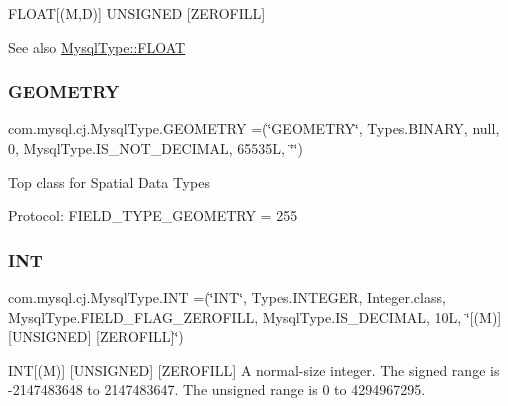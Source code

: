 F\+L\+O\+AT\mbox{[}(M,D)\mbox{]} U\+N\+S\+I\+G\+N\+ED \mbox{[}Z\+E\+R\+O\+F\+I\+LL\mbox{]}

\begin{DoxySeeAlso}{See also}
\mbox{\hyperlink{enumcom_1_1mysql_1_1cj_1_1_mysql_type_ae8cf970114766445c4e064ee748fb74c}{Mysql\+Type\+::\+F\+L\+O\+AT}} 
\end{DoxySeeAlso}
\mbox{\label{enumcom_1_1mysql_1_1cj_1_1_mysql_type_aa49cdfb7c144fe5dcf23fe5c31bfe82d}} 
\subsubsection{\texorpdfstring{G\+E\+O\+M\+E\+T\+RY}{GEOMETRY}}
{\footnotesize\ttfamily com.\+mysql.\+cj.\+Mysql\+Type.\+G\+E\+O\+M\+E\+T\+RY =(\char`\"{}G\+E\+O\+M\+E\+T\+RY\char`\"{}, Types.\+B\+I\+N\+A\+RY, null, 0, Mysql\+Type.\+I\+S\+\_\+\+N\+O\+T\+\_\+\+D\+E\+C\+I\+M\+AL, 65535\+L, \char`\"{}\char`\"{})}

Top class for Spatial Data Types

Protocol\+: F\+I\+E\+L\+D\+\_\+\+T\+Y\+P\+E\+\_\+\+G\+E\+O\+M\+E\+T\+RY = 255 \mbox{\label{enumcom_1_1mysql_1_1cj_1_1_mysql_type_a01116c8fe484233659c251ee68f56d25}} 
\subsubsection{\texorpdfstring{I\+NT}{INT}}
{\footnotesize\ttfamily com.\+mysql.\+cj.\+Mysql\+Type.\+I\+NT =(\char`\"{}I\+NT\char`\"{}, Types.\+I\+N\+T\+E\+G\+ER, Integer.\+class, Mysql\+Type.\+F\+I\+E\+L\+D\+\_\+\+F\+L\+A\+G\+\_\+\+Z\+E\+R\+O\+F\+I\+LL, Mysql\+Type.\+I\+S\+\_\+\+D\+E\+C\+I\+M\+AL, 10\+L, \char`\"{}\mbox{[}(\+M)\mbox{]} \mbox{[}\+U\+N\+S\+I\+G\+N\+E\+D\mbox{]} \mbox{[}\+Z\+E\+R\+O\+F\+I\+L\+L\mbox{]}\char`\"{})}

I\+NT\mbox{[}(M)\mbox{]} \mbox{[}U\+N\+S\+I\+G\+N\+ED\mbox{]} \mbox{[}Z\+E\+R\+O\+F\+I\+LL\mbox{]} A normal-\/size integer. The signed range is -\/2147483648 to 2147483647. The unsigned range is 0 to 4294967295.

